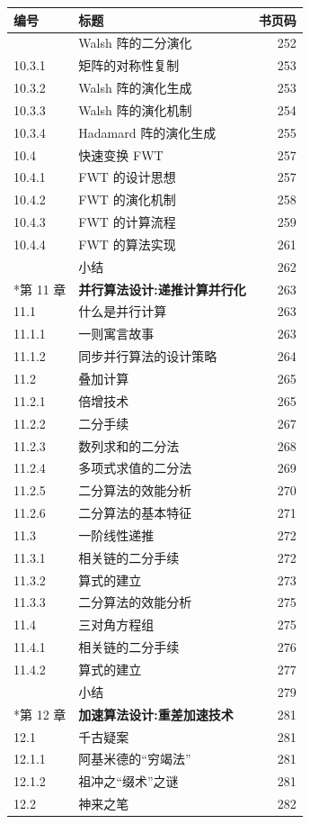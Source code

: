 {\def\LTcaptype{none} %
\begin{longtable}[]{@{}llr@{}}
\toprule\noalign{}
编号 & 标题 & 书页码 \\
\midrule\noalign{}
\endhead
\bottomrule\noalign{}
\endlastfoot
10.3 & Walsh 阵的二分演化 & 252 \\
10.3.1 & 矩阵的对称性复制 & 253 \\
10.3.2 & Walsh 阵的演化生成 & 253 \\
10.3.3 & Walsh 阵的演化机制 & 254 \\
10.3.4 & Hadamard 阵的演化生成 & 255 \\
10.4 & 快速变换 FWT & 257 \\
10.4.1 & FWT 的设计思想 & 257 \\
10.4.2 & FWT 的演化机制 & 258 \\
10.4.3 & FWT 的计算流程 & 259 \\
10.4.4 & FWT 的算法实现 & 261 \\
& 小结 & 262 \\
*第 11 章 & \textbf{并行算法设计:递推计算并行化} & 263 \\
11.1 & 什么是并行计算 & 263 \\
11.1.1 & 一则寓言故事 & 263 \\
11.1.2 & 同步并行算法的设计策略 & 264 \\
11.2 & 叠加计算 & 265 \\
11.2.1 & 倍增技术 & 265 \\
11.2.2 & 二分手续 & 267 \\
11.2.3 & 数列求和的二分法 & 268 \\
11.2.4 & 多项式求值的二分法 & 269 \\
11.2.5 & 二分算法的效能分析 & 270 \\
11.2.6 & 二分算法的基本特征 & 271 \\
11.3 & 一阶线性递推 & 272 \\
11.3.1 & 相关链的二分手续 & 272 \\
11.3.2 & 算式的建立 & 273 \\
11.3.3 & 二分算法的效能分析 & 275 \\
11.4 & 三对角方程组 & 275 \\
11.4.1 & 相关链的二分手续 & 276 \\
11.4.2 & 算式的建立 & 277 \\
& 小结 & 279 \\
*第 12 章 & \textbf{加速算法设计:重差加速技术} & 281 \\
12.1 & 千古疑案 & 281 \\
12.1.1 & 阿基米德的``穷竭法'' & 281 \\
12.1.2 & 祖冲之``缀术''之谜 & 281 \\
12.2 & 神来之笔 & 282 \\
\end{longtable}
}

